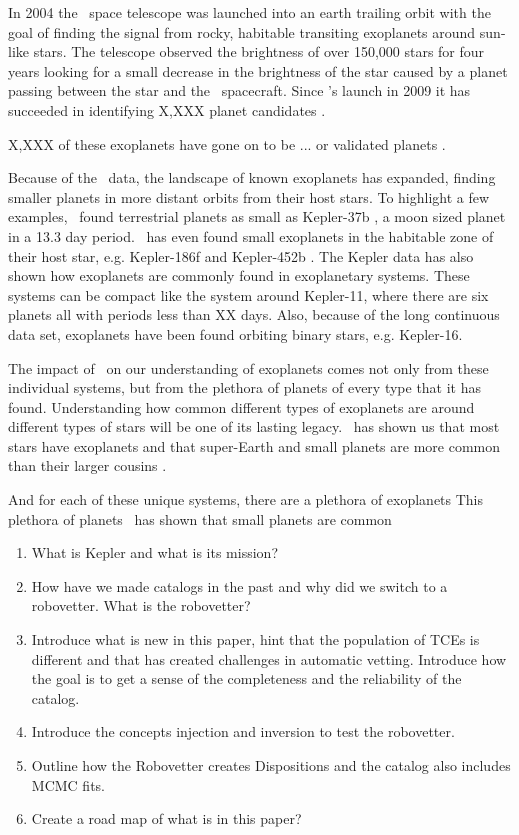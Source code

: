 In 2004 the \Kepler\ space telescope was launched into an earth trailing orbit with the goal of finding the signal from rocky, habitable transiting exoplanets \citep{Koch2010} around sun-like stars. The telescope observed the brightness of over 150,000 stars for four years looking for a small decrease in the brightness of the star caused by a planet passing between the star and the \Kepler\ spacecraft. 
Since \Kepler's launch in 2009 it has succeeded in identifying X,XXX planet candidates \citep{Borucki2010a,Coughlin2016}. 

X,XXX of these exoplanets have gone on to be ... or validated planets \citep[see most recently][]{Morton2016}.  %

Because of the \Kepler\ data, the landscape of known exoplanets has expanded, finding smaller planets in more distant orbits from their host stars.  To highlight a few examples,  \Kepler\ found terrestrial planets as small as Kepler-37b \citep{Barclay2013}, a moon sized planet in a 13.3 day period. \Kepler\ has even found small exoplanets in the habitable zone of their host star, e.g. Kepler-186f \citep{Quintana2014} and Kepler-452b \citep{Jenkins2015}.  The Kepler data has also shown how exoplanets are commonly found in exoplanetary systems. These systems can be compact like the system around Kepler-11, where there are six planets all with periods less than XX days. Also, because of the long continuous data set, exoplanets have been found orbiting binary stars, e.g. Kepler-16\citep{Doyle2011}.


The impact of \Kepler\ on our understanding of exoplanets comes not only from these individual systems, but from the plethora of planets of every type that it has found. Understanding how common different types of exoplanets are around different types of stars will be one of its lasting legacy. \Kepler\ has shown us that most stars have exoplanets and that super-Earth and small planets are more common than their larger cousins \citet{Burke2015}.  


And for each of these unique systems, there are a plethora of exoplanets This plethora of planets \Kepler\ has shown that small planets are common 

\begin{enumerate}
\item What is Kepler and what is its mission?
\item How have we made catalogs in the past and why did we switch to a robovetter. What is the robovetter?
\item Introduce what is new in this paper, hint that the population of TCEs is different and that has created challenges in automatic vetting. Introduce how the goal is to get a sense of the completeness and the reliability of the catalog.
\item Introduce the concepts injection and inversion to test the robovetter.
\item Outline how the Robovetter creates Dispositions and the catalog also includes MCMC fits.
\item Create a road map of what is in this paper?
\end{enumerate}

